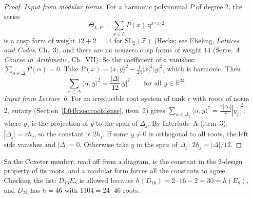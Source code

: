 \documentclass[11pt,openany]{book}
\theoremstyle{plain}
\theoremstyle{definition}
\theoremstyle{remark}
\newcommand{\R}{\mathbb{R}}
\newcommand{\Z}{\mathbb{Z}}
\newcommand{\SL}{\mathrm{SL}}
\newcommand{\abs}[1]{\left\lvert #1 \right\rvert}
\newcommand{\ip}[2]{\langle #1, #2\rangle}
\begin{document}
\begin{proof}
\emph{Input from modular forms.} For a harmonic polynomial $P$ of degree $2$, the series
\[
  \Theta_{L,P}=\sum_{x\in L}P(x)\,\mathsf q^{x\cdot x/2}
\]
is a cusp form of weight $12+2=14$ for $\SL_2(\Z)$ (Hecke; see Ebeling, \emph{Lattices and Codes},
Ch.~3), and there are no nonzero cusp forms of weight $14$ (Serre, \emph{A Course in Arithmetic},
Ch.~VII). So the coefficient of $\mathsf q$ vanishes: $\sum_{\alpha\in\Delta}P(\alpha)=0$. Take $P(x)=\ip xy^2-\frac{1}{24}\abs x^2\abs y^2$, which is harmonic. Then
\[
  \sum_{\alpha\in\Delta}\ip\alpha y^2=\frac{\abs\Delta}{12}\abs y^2\qquad\text{for all }y\in\R^{24}.
\]
\emph{Input from Lecture~6.} For an irreducible root system of rank $r$ with roots of norm $2$, eutaxy
(Section~\ref{L04b:sec:rootdense}, item~2) gives $\sum_{\alpha\in\Delta_j}\ip\alpha y^2=\frac{2\abs{\Delta_j}}{r}\abs{y_j}^2$,
where $y_j$ is the projection of $y$ to the span of $\Delta_j$. By Interlude~A (item~3),
$\abs{\Delta_j}=rh_j$, so the constant is $2h_j$. If some $y\ne0$ is orthogonal to all roots, the left
side vanishes and $\abs\Delta=0$. Otherwise take $y$ in the span of $\Delta_j$: $2h_j=\abs\Delta/12$.
\end{proof}

So the Coxeter number, read off from a diagram, is the constant in the $2$-design property of its roots,
and a modular form forces all the constants to agree. Checking the list: $D_{16}E_8$ is allowed because
$h(D_{16})=2\cdot16-2=30=h(E_8)$, and $D_{24}$ has $h=46$ with $1104=24\cdot46$ roots.
\end{document}
